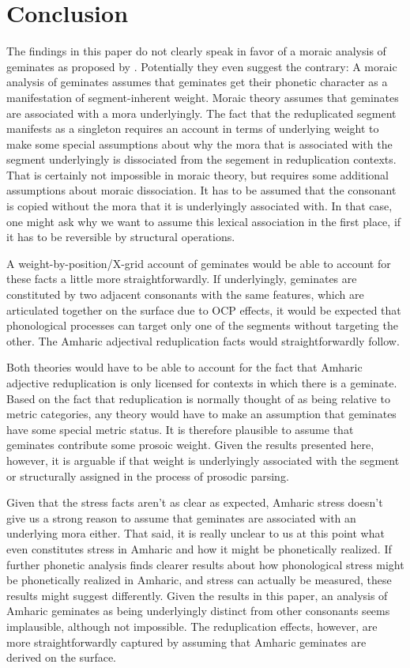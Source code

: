 \documentclass[12pt]{scrartcl}
\begin{document}
\section{Conclusion}

The findings in this paper do not clearly speak in favor of a moraic analysis of geminates as proposed by \cite{sande2017}. Potentially they even suggest the contrary: A moraic analysis of geminates assumes that geminates get their phonetic character as a manifestation of segment-inherent weight. Moraic theory assumes that geminates are associated with a mora underlyingly. The fact that the reduplicated segment manifests as a singleton requires an account in terms of underlying weight to make some special assumptions about why the mora that is associated with the segment underlyingly is dissociated from the segement in reduplication contexts. That is certainly not impossible in moraic theory, but requires some additional assumptions about moraic dissociation. It has to be assumed that the consonant is copied without the mora that it is underlyingly associated with. In that case, one might ask why we want to assume this lexical association in the first place, if it has to be reversible by structural operations.

A weight-by-position/X-grid account of geminates would be able to account for these facts a little more straightforwardly. If underlyingly, geminates are constituted by two adjacent consonants with the same features, which are articulated together on the surface due to OCP effects, it would be expected that phonological processes can target only one of the segments without targeting the other. The Amharic adjectival reduplication facts would straightforwardly follow.

Both theories would have to be able to account for the fact that Amharic adjective reduplication is only licensed for contexts in which there is a geminate. Based on the fact that reduplication is normally thought of as being relative to metric categories, any theory would have to make an assumption that geminates have some special metric status. It is therefore plausible to assume that geminates contribute some prosoic weight. Given the results presented  here, however, it is arguable if that weight is underlyingly associated with the segment or structurally assigned in the process of prosodic parsing.

Given that the stress facts aren't as clear as expected, Amharic stress doesn't give us a strong reason to assume that geminates are associated with an underlying mora either. That said, it is really unclear to us at this point what even constitutes stress in Amharic and how it might be phonetically realized. If further phonetic analysis finds clearer results about how phonological stress might be phonetically realized in Amharic, and stress can actually be measured, these results might suggest differently. Given the results in this paper, an analysis of Amharic geminates as being underlyingly distinct from other consonants seems implausible, although not impossible. The reduplication effects, however, are more straightforwardly captured by assuming that Amharic geminates are derived on the surface.





\end{document}

